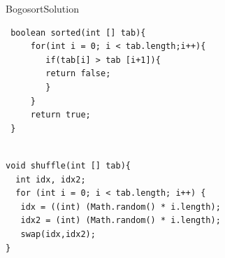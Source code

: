 \documentclass[12pt,a4paper]{beamer}
\begin{document}
\begin{frame}[fragile]{Bogosort}{Solution}

\begin{lstlisting}
 boolean sorted(int [] tab){
     for(int i = 0; i < tab.length;i++){
        if(tab[i] > tab [i+1]){
        return false;
        }
     }
     return true;
 }
 

 \end{lstlisting}

\pause

\begin{lstlisting}
void shuffle(int [] tab){
  int idx, idx2;
  for (int i = 0; i < tab.length; i++) {
   idx = ((int) (Math.random() * i.length);
   idx2 = (int) (Math.random() * i.length);
   swap(idx,idx2);
}

 \end{lstlisting}


\end{frame}
\end{document}
